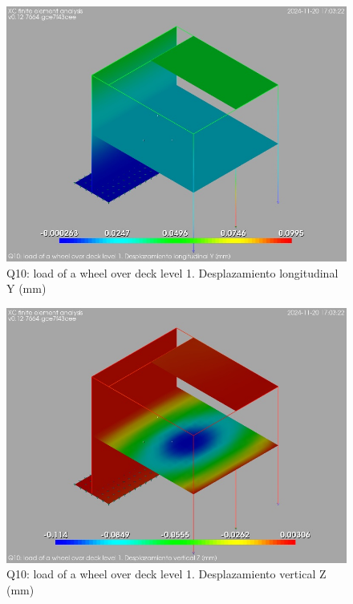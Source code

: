 \begin{figure}[ht]
\begin{center}
\includegraphics[width=\linewidth]{results/graphics/resSimplLC/QwheelDeck1uY.png}
\caption{Q10: load of a wheel over deck level 1. Desplazamiento longitudinal Y (mm)}
\label{QwheelDeck1uY}
\end{center}
\end{figure}
\begin{figure}[ht]
\begin{center}
\includegraphics[width=\linewidth]{results/graphics/resSimplLC/QwheelDeck1uZ.png}
\caption{Q10: load of a wheel over deck level 1. Desplazamiento vertical Z (mm)}
\label{QwheelDeck1uZ}
\end{center}
\end{figure}
